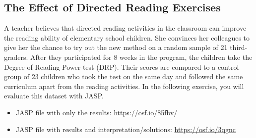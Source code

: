 \documentclass[
]{book}
\providecommand{\tightlist}{%
  \setlength{\itemsep}{0pt}\setlength{\parskip}{0pt}}
\begin{document}
\hypertarget{the-effect-of-directed-reading-exercises}{%
\subsection{The Effect of Directed Reading Exercises}\label{the-effect-of-directed-reading-exercises}}

A teacher believes that directed reading activities in the classroom can improve the reading ability of elementary school children. She convinces her colleagues to give her the chance to try out the new method on a random sample of 21 third-graders. After they participated for 8 weeks in the program, the children take the Degree of Reading Power test (DRP). Their scores are compared to a control group of 23 children who took the test on the same day and followed the same curriculum apart from the reading activities. In the following exercise, you will evaluate this dataset with JASP.

\begin{itemize}
\tightlist
\item
  JASP file with only the results: \url{https://osf.io/85fbv/}
\item
  JASP file with results and interpretation/solutions: \url{https://osf.io/3qgnc}
\end{itemize}
\end{document}
